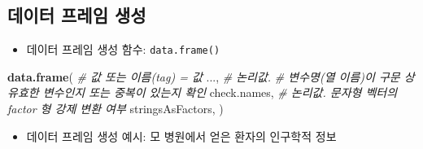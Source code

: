 \documentclass[
  11pt,
]{krantz}
\newenvironment{Shaded}{\begin{snugshade}}{\end{snugshade}}
\newcommand{\CommentTok}[1]{\textcolor[rgb]{0.37,0.37,0.37}{\textit{#1}}}
\newcommand{\KeywordTok}[1]{\textcolor[rgb]{0.27,0.27,0.27}{\textbf{#1}}}
\newcommand{\NormalTok}[1]{#1}
\providecommand{\tightlist}{%
  \setlength{\itemsep}{0pt}\setlength{\parskip}{0pt}}
\begin{document}
\hypertarget{create-data-frame}{%
\subsection{데이터 프레임 생성}\label{create-data-frame}}

\begin{itemize}
\tightlist
\item
  데이터 프레임 생성 함수: \texttt{data.frame()}
\end{itemize}

\footnotesize

\begin{Shaded}
\begin{Highlighting}[]
\KeywordTok{data.frame}\NormalTok{(}
  \CommentTok{# 값 또는 이름(tag) = 값}
\NormalTok{  ..., }
  \CommentTok{# 논리값. }
  \CommentTok{# 변수명(열 이름)이 구문 상 유효한 변수인지 또는 중복이 있는지 확인}
\NormalTok{  check.names, }
  \CommentTok{# 논리값. 문자형 벡터의 factor 형 강제 변환 여부 }
\NormalTok{  stringsAsFactors, }
\NormalTok{)}
\end{Highlighting}
\end{Shaded}

\normalsize

\begin{itemize}
\tightlist
\item
  데이터 프레임 생성 예시: 모 병원에서 얻은 환자의 인구학적 정보
\end{itemize}

\footnotesize
\end{document}
